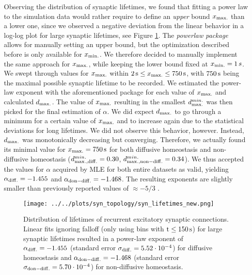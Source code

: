 \documentclass[10pt,a4paper]{article}
\begin{document}
Observing the distribution of synaptic lifetimes, we found that fitting a power law to the simulation data would rather require to define an \emph{upper} bound $x_{\rm max.}$ than a lower one, since we observed a negative deviation from the linear behavior in a log-log plot for large synaptic lifetimes, see Figure \ref{Syn_Lifetimes}. The \textit{powerlaw package} allows for manually setting an upper bound, but the optimization described before is only available for $x_{\rm min.}$. We therefore decided to manually implement the same approach for $x_{\rm max.}$, while keeping the lower bound fixed at $x_{\rm min.} = 1 \, s$.
We swept through values for $x_{\rm max.}$ within $\mathrm{2\,s} \leq x_{\rm max.} \leq \mathrm{750\,s}$, with $\rm 750 \, s$ being the maximal possible synaptic lifetime to be recorded. We estimated the power-law exponent with the aforementioned package for each value of $x_{\rm max.}$ and calculated $d_{\rm max.}$. The value of $x_{\rm max.}$ resulting in the smallest $d_{\rm max.}^{min.}$ was then picked for the final estimation of $\alpha$. We did expect $d_{\rm max.}$ to go through a minimum for a certain value of $x_{\rm max.}$ and to increase again due to the statistical deviations for long lifetimes. We did not observe this behavior, however. Instead, $d_{\rm max.}$ was monotonically decreasing but converging. Therefore, we actually found its minimal value for $x_{\rm max.} = \rm 750 \, s$ for both diffusive homeostasis and non-diffusive homeostasis ($d_{\rm max.,diff.}^{min.} = 0.30$, $d_{\rm max.,non-diff.}^{min.} = 0.34$). We thus accepted the values for $\alpha$ acquired by MLE for both entire datasets as valid, yielding $\mathrm{\alpha_{\rm diff.} = -1.455}$ and $\mathrm{\alpha_{\rm don-diff.} = -1.468}$. The resulting exponents are slightly smaller than previously reported values of $\mathrm{\approx - 5/3}$ \cite{SORN_Paper}. 
\begin{figure}
\texttt{[image: ../../plots/syn\_topology/syn\_lifetimes\_new.png]}
\caption[Distribution of lifetimes of recurrent excitatory synaptic connections]{Distribution of lifetimes of recurrent excitatory synaptic connections. Linear fits ignoring falloff (only using bins with $\rm t \leq 150 \, s$) for large synaptic lifetimes resulted in a power-law exponent of $\mathrm{\alpha_{\rm diff.} = -1.455}$ (standard error $\mathrm{\sigma_{\rm diff.} = 5.52 \cdot 10^{-4}}$) for diffusive homeostasis and $\mathrm{\alpha_{\rm don-diff.} = -1.468}$ (standard error $\mathrm{\sigma_{\rm don-diff.} = 5.70 \cdot 10^{-4}}$) for non-diffusive homeostasis.}
\label{Syn_Lifetimes}
\end{figure}
\end{document}
